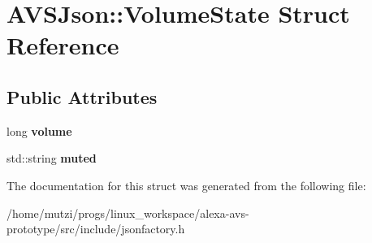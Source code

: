 \hypertarget{structAVSJson_1_1VolumeState}{}\section{A\+V\+S\+Json\+:\+:Volume\+State Struct Reference}
\label{structAVSJson_1_1VolumeState}
\subsection*{Public Attributes}
\begin{DoxyCompactItemize}
\item 
\mbox{\label{structAVSJson_1_1VolumeState_a9848bea24376afa8cd22606e1bd6407f}} 
long {\bfseries volume}
\item 
\mbox{\label{structAVSJson_1_1VolumeState_aaa620eb455be6074119fde9244d73dd1}} 
std\+::string {\bfseries muted}
\end{DoxyCompactItemize}


The documentation for this struct was generated from the following file\+:\begin{DoxyCompactItemize}
\item 
/home/mutzi/progs/linux\+\_\+workspace/alexa-\/avs-\/prototype/src/include/jsonfactory.\+h\end{DoxyCompactItemize}
